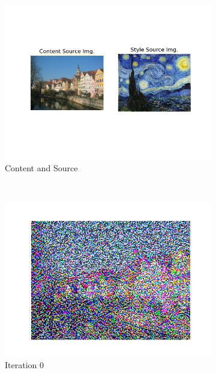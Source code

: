 \documentclass[12pt]{article}
\begin{document}
\begin{figure}[htbp]
    \centering
    \begin{subfigure}[t]{0.48\textwidth}
        \centering
        \includegraphics[trim={3in 1in 3in 1in},scale=0.8]{./Homework2/output/hw2p2_fig09.png}
        \caption{Content and Source}
    \label{hw2p2i}
    \end{subfigure}\\
    \begin{subfigure}[t]{0.48\textwidth}
        \centering
        \includegraphics[trim={3in 0in 3in 0in},scale=0.45]{./Homework2/output/hw2p2_fig10.png}
        \caption{Iteration 0}
    \label{hw2p2j}
    \end{subfigure}
    \begin{subfigure}[t]{0.48\textwidth}

\end{subfigure}
\end{figure}
\end{document}
